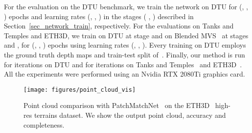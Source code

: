 \documentclass{bmvc2k}
\begin{document}
For the evaluation on the DTU benchmark, we train the network on DTU for (, , ) epochs and learning rates (, , ) in the stages ( , ) described in Section~\ref{sec_network_train}, respectively.
For the evaluations on Tanks and Temples and ETH3D, we train on DTU at stage  and on Blended MVS~\cite{blended_mvs} at stages  and , for (, , ) epochs using learning rates (, , ).
Every training on DTU employs the ground truth depth maps and train-test split of~\cite{mvsnet}.
Finally, our method is run for  iterations on DTU and for  iterations on Tanks and Temples~\cite{tanksandtemples} and ETH3D~\cite{eth3d}. 
All the experiments were performed using an Nvidia RTX 2080Ti graphics card.
\begin{figure}[t]
\centering
\texttt{[image: figures/point\_cloud\_vis]}
\vspace{-20pt}
\caption{
Point cloud comparison with PatchMatchNet~\cite{patchmatchnet} on the ETH3D~\cite{eth3d} high-res terrains dataset. We show the output point cloud, accuracy and completeness.
\vspace{-8pt}
}
\label{fig_point_cloud_results}
\end{figure}
\end{document}
